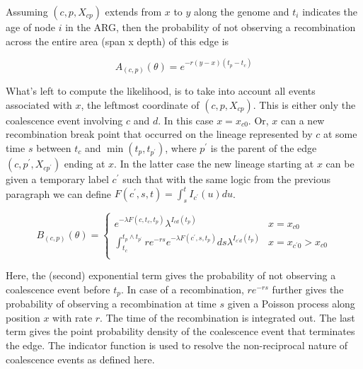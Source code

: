 \documentclass{article}
\begin{document}
Assuming $(c, p, X_{cp})$ extends from $x$ to $y$ along the genome and $t_i$ 
indicates the age of 
node $i$ in the ARG, then the probability of not observing a recombination across the 
entire area (span x depth) of this edge is 

\begin{equation}\label{eq:span}
A_{(c, p)}(\theta) = e^{-r (y-x)(t_p - t_{c})}
\end{equation}

What's left to compute the likelihood, is to take into account all events 
associated with $x$, 
the leftmost coordinate of $(c, p, X_{cp})$. This is either only the 
coalescence event involving 
$c$ and $d$. In this case $x=x_{c0}$. Or, $x$ can a new recombination break point that 
occurred on the lineage represented by $c$ at some time $s$ between $t_{c}$ 
and $\min(t_p, t_{p^{\prime}})$, where $p^{\prime}$ is the parent of the 
edge $(c, p^{\prime}, X_{cp^{\prime}})$ ending at $x$.
In the latter case the new lineage starting at $x$ can be given a temporary label 
$c^{\prime}$ such that with the same logic from the previous paragraph we 
can define $F(c^{\prime}, s, t) = \int_{s}^{t} I_{c^{\prime}}(u)du$. 

\begin{equation}\label{eq:depth}
B_{(c, p)}(\theta) = \begin{cases}
e^{-\lambda F(c, t_c, t_p)} \lambda^{I_{cd}(t_p)} & x=x_{c0} \\
\int_{t_c}^{t_{p} \wedge t_{p^{\prime}}} r e^{-rs} e^{-\lambda F(c^{\prime}, s, t_{p})} ds \lambda^{I_{c^{\prime}d}(t_p)} & x=x_{c^{\prime}0}>x_{c0} \\
\end{cases}
\end{equation}

Here, the (second) exponential term gives the probability of not observing a 
coalescence event before $t_p$. In case of a recombination, $re^{-rs}$ further 
gives the probability of observing a recombination 
at time $s$ given a Poisson process along position $x$ with rate $r$. The 
time of the recombination is integrated out.
The last term gives the point probability density of the coalescence event 
that terminates the edge. The indicator function is used to resolve 
the non-reciprocal nature of coalescence events as defined here.\\
\end{document}
